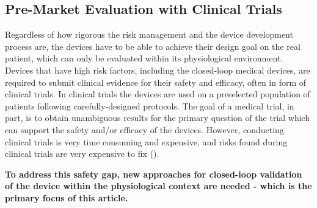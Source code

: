 \subsection{Pre-Market Evaluation with Clinical Trials}
Regardless of how rigorous the risk management and the device development process are, the devices have to be able to achieve their design goal on the real patient, which can only be evaluated within its physiological environment. Devices that have high risk factors, including the closed-loop medical devices, are required to submit clinical evidence for their safety and efficacy, often in form of clinical trials. In clinical trials the devices are used on a preselected population of patients following carefully-designed protocols. The goal of a medical trial, in part, is  to obtain unambiguous results for the primary question of the trial which can support the safety and/or efficacy of the devices. However, conducting clinical trials is very time consuming and expensive, and risks found during clinical trials are very expensive to fix (\cite{trialcost}). 

\textbf{To address this safety gap, new approaches for closed-loop validation of the device within the physiological context are needed - which is the primary focus of this article.}


